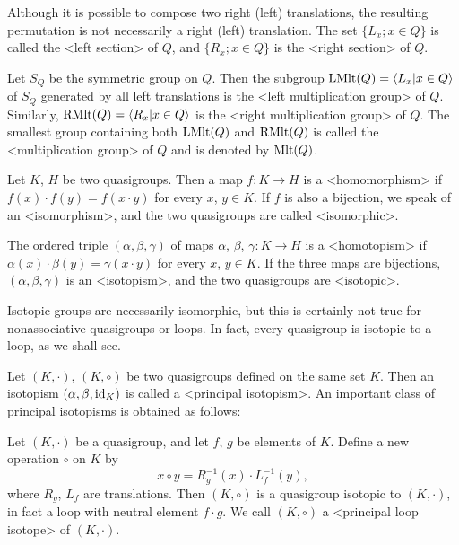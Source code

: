 Although it is possible to compose two right (left) translations, the resulting
permutation is not necessarily a right (left) translation. The set $\{L_x;x\in
Q\}$ is called the <left section> of $Q$, and $\{R_x;x\in
Q\}$ is the <right section> of $Q$.

Let $S_Q$ be the symmetric group on $Q$. Then the subgroup
${\rm{LMlt}}(Q)=\langle L_x|x\in Q\rangle$ of $S_Q$ generated by all left
translations is the <left multiplication group> of $Q$. Similarly, ${\rm{RMlt}}(Q)= \langle R_x|x\in Q\rangle$ is
the <right multiplication group> of $Q$. The
smallest group containing both ${\rm{LMlt}}(Q)$ and ${\rm{RMlt}}(Q)$ is called
the <multiplication group> of $Q$ and is denoted by
${\rm{Mlt}}(Q)$.


Let $K$, $H$ be two quasigroups. Then a map $f:K\to H$ is a
<homomorphism> if $f(x)\cdot f(y)=f(x\cdot y)$ for every
$x$, $y\in K$. If $f$ is also a bijection, we speak of an
<isomorphism>, and the two quasigroups are called
<isomorphic>.

The ordered triple $(\alpha,\beta,\gamma)$ of maps $\alpha$, $\beta$,
$\gamma:K\to H$ is a <homotopism> if $\alpha(x)\cdot\beta(y)
= \gamma(x\cdot y)$ for every $x$, $y\in K$. If the three maps are bijections,
$(\alpha,\beta,\gamma)$ is an <isotopism>, and the two
quasigroups are <isotopic>.

Isotopic groups are necessarily isomorphic, but this is certainly not true for
nonassociative quasigroups or loops. In fact, every quasigroup is isotopic to a
loop, as we shall see.

Let $(K,\cdot)$, $(K,\circ)$ be two quasigroups defined on the same set $K$.
Then an isotopism $(\alpha,\beta,{\rm{id}}_K)$ is called a <principal
isotopism>. An important class of principal
isotopisms is obtained as follows:

Let $(K,\cdot)$ be a quasigroup, and let $f$, $g$ be elements of $K$. Define a
new operation $\circ$ on $K$ by
$$
    x\circ y = R_g^{-1}(x)\cdot L_f^{-1}(y),
$$
where $R_g$, $L_f$ are translations. Then $(K,\circ)$ is a quasigroup isotopic
to $(K,\cdot)$, in fact a loop with neutral element $f\cdot g$. We call
$(K,\circ)$ a <principal loop isotope> of
$(K,\cdot)$.

